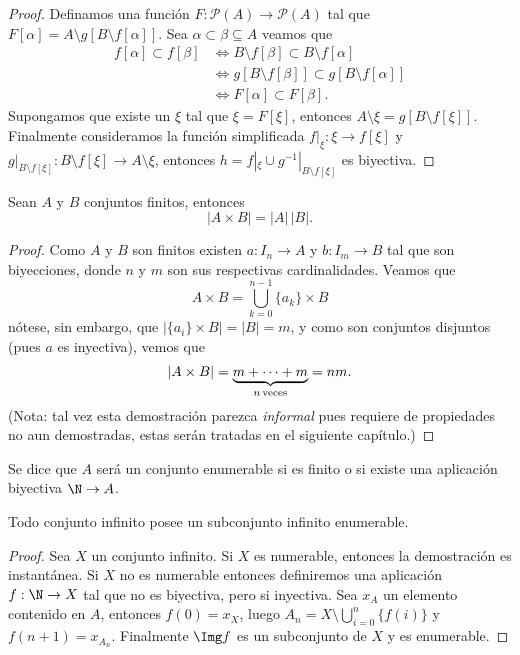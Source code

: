 \documentclass[11pt,oneside,a4paper]{book}
\renewcommand{\P}{\mathcal{P}}
\begin{document}
\begin{proof}
Definamos una función $F:\P(A)\rightarrow\P(A)$ tal que $F[\alpha]=A\setminus g\left[B\setminus f[\alpha]\right]$. Sea $\alpha\subset\beta\subseteq A$ veamos que
\begin{align*}
f[\alpha]\subset f[\beta]&\iff B\setminus f[\beta]\subset B\setminus f[\alpha]\\
&\iff g\left[B\setminus f[\beta]\right]\subset g\left[B\setminus f[\alpha]\right]\\
&\iff F[\alpha]\subset F[\beta].
\end{align*}
Supongamos que existe un $\xi$ tal que $\xi=F[\xi]$, entonces $A\setminus\xi=g\left[B\setminus f[\xi]\right]$. Finalmente consideramos la función simplificada $f|_\xi:\xi\rightarrow f[\xi]$ y $g|_{B\setminus f[\xi]}:B\setminus f[\xi]\rightarrow A\setminus\xi$, entonces $h=f|_\xi\cup g^{-1}|_{B\setminus f[\xi]}$ es biyectiva.
\end{proof}
\begin{thm}
Sean $A$ y $B$ conjuntos finitos, entonces
$$|A\times B|=|A|\,|B|.$$
\end{thm}
\begin{proof}
Como $A$ y $B$ son finitos existen $a:I_n\rightarrow A$ y $b:I_m\rightarrow B$ tal que son biyecciones, donde $n$ y $m$ son sus respectivas cardinalidades. Veamos que
$$A\times B=\bigcup_{k=0}^{n-1}\{a_k\}\times B$$
nótese, sin embargo, que $|\{a_i\}\times B|=|B|=m$, y como son conjuntos disjuntos (pues $a$ es inyectiva), vemos que
$$|A\times B|=\underbrace{m+\cdots+m}_{n\,\rm veces}=nm.$$
(Nota: tal vez esta demostración parezca \textit{informal} pues requiere de propiedades no aun demostradas, estas serán tratadas en el siguiente capítulo.)
\end{proof}
\begin{mydef}
Se dice que $A$ será un conjunto enumerable si es finito o si existe una aplicación biyectiva $\N\rightarrow A$.
\end{mydef}
\begin{thm}
Todo conjunto infinito posee un subconjunto infinito enumerable.
\end{thm}
\begin{proof}
Sea $X$ un conjunto infinito. Si $X$ es numerable, entonces la demostración es instantánea. Si $X$ no es numerable entonces definiremos una aplicación $f:\N\rightarrow X$ tal que no es biyectiva, pero si inyectiva. Sea $x_A$ un elemento contenido en $A$, entonces $f(0)=x_X$, luego $A_n=X\setminus\bigcup_{i=0}^n\{f(i)\}$ y $f(n+1)=x_{A_n}$. Finalmente $\Img f$ es un subconjunto de $X$ y es enumerable.
\end{proof}
\end{document}
